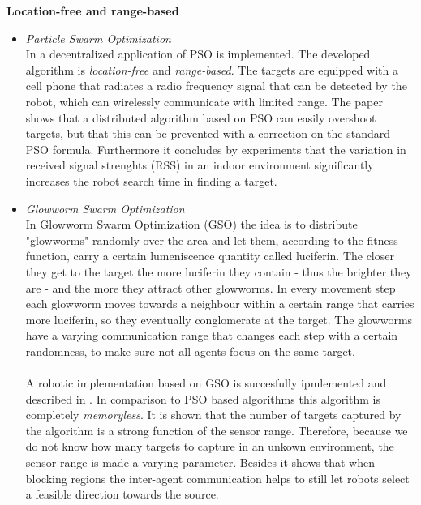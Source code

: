 	\textbf{Location-free and range-based}
	\begin{itemize}
		\item
		\textit{Particle Swarm Optimization}\\
		In \cite{derr2009multi} a decentralized application of PSO is implemented.
		The developed algorithm is \emph{location-free} and \emph{range-based}.
		The targets are equipped with a cell phone that radiates a radio frequency signal that can be detected by the robot, which can wirelessly communicate with limited range.
		The paper shows that a distributed algorithm based on PSO can easily overshoot targets, but that this can be prevented with a correction on the standard PSO formula.
		Furthermore it concludes by experiments that the variation in received signal strenghts (RSS) in an indoor environment significantly increases the robot search time in finding a target.

		\item
		\textit{Glowworm Swarm Optimization}\\
		In Glowworm Swarm Optimization (GSO) the idea is to distribute "glowworms" randomly over the area and let them, according to the fitness function, carry a certain lumeniscence quantity called luciferin. 
		The closer they get to the target the more luciferin they contain - thus the brighter they are - and the more they attract other glowworms. 
		In every movement step each glowworm moves towards a neighbour within a certain range that carries more luciferin, so they eventually conglomerate at the target. 
		The glowworms have a varying communication range that changes each step with a certain randomness, to make sure not all agents focus on the same target. \cite{krishnanand2006glowworm}\\
		\\
		A robotic implementation based on GSO is succesfully ipmlemented and described in \cite{krishnanand2005detection}.
		In comparison to PSO based algorithms this algorithm is completely \emph{memoryless}.
		It is shown that the number of targets captured by the algorithm is a strong function of the sensor range.
		Therefore, because we do not know how many targets to capture in an unkown environment, the sensor range is made a varying parameter.
		Besides it shows that when blocking regions the inter-agent communication helps to still let robots select a feasible direction towards the source.

	\end{itemize}


